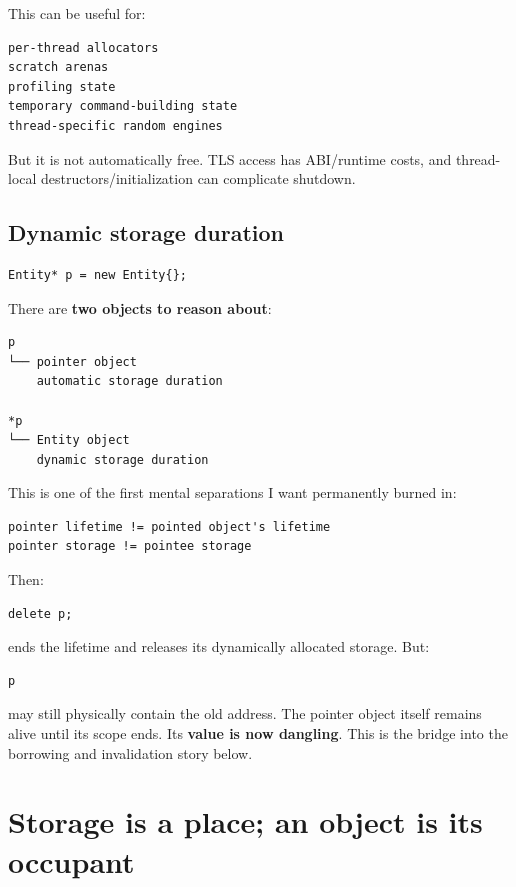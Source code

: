 This can be useful for:

\begin{verbatim}
per-thread allocators
scratch arenas
profiling state
temporary command-building state
thread-specific random engines
\end{verbatim}

But it is not automatically free. TLS access has ABI/runtime costs, and thread-local destructors/initialization can complicate shutdown.

\subsection{Dynamic storage duration}\label{05-engine-i-ch002-dynamic-storage-duration}

\hypertarget{05-engine-i-ch002-dynamic-storage-duration}{}

\begin{verbatim}
Entity* p = new Entity{};
\end{verbatim}

There are \textbf{two objects to reason about}:

\begin{verbatim}
p
└── pointer object
    automatic storage duration

*p
└── Entity object
    dynamic storage duration
\end{verbatim}

This is one of the first mental separations I want permanently burned in:

\begin{verbatim}
pointer lifetime != pointed object's lifetime
pointer storage != pointee storage
\end{verbatim}

Then:

\begin{verbatim}
delete p;
\end{verbatim}

ends the  lifetime and releases its dynamically allocated storage. But:

\begin{verbatim}
p
\end{verbatim}

may still physically contain the old address. The pointer object itself remains alive until its scope ends. Its \textbf{value is now dangling}. This is the bridge into the borrowing and invalidation story below.

\section{Storage is a place; an object is its occupant}\label{05-engine-i-ch002-storage-is-a-place-an-object-is-its-occupant}

